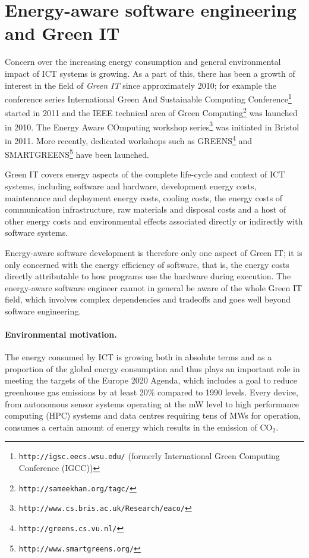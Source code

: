 \documentclass[oneside]{book}
\begin{document}
\section{Energy-aware software engineering and Green IT}
\label{greenit}
Concern over the increasing energy consumption and general environmental impact of ICT systems is growing.  As a part of this,
there has been a growth of interest in the field of \emph{Green IT}  \cite{KrauseCraigWood2010,DBLP:journals/stt/NaumannKD13,DBLP:journals/infsof/CapraFS12,Mahmoud_Ahmad_2013} since approximately 2010; for example the conference series International Green And Sustainable Computing Conference\footnote{\texttt{http://igsc.eecs.wsu.edu/} (formerly International Green Computing Conference (IGCC))} started in 2011 and the IEEE technical area of Green Computing\footnote{\texttt{http://sameekhan.org/tagc/}} was launched in 2010.  The Energy Aware COmputing workshop series\footnote{\texttt{http://www.cs.bris.ac.uk/Research/eaco/}} was initiated in Bristol in 2011.
More recently, dedicated workshops such as GREENS\footnote{\texttt{http://greens.cs.vu.nl/}} and SMARTGREENS\footnote{\texttt{http://www.smartgreens.org/}} have been launched. 

Green IT covers energy aspects of the complete life-cycle and context of ICT systems, including software and hardware, development energy costs, maintenance and deployment energy costs, cooling costs, the energy costs of communication infrastructure, raw materials and disposal costs and a host of other energy costs and environmental effects associated directly or indirectly with software systems. 



Energy-aware software development is therefore only one aspect of Green IT;  it is only concerned with the energy efficiency of software, that is, the energy costs directly attributable to how programs use the hardware during execution. The energy-aware software engineer cannot in general be aware of the whole Green IT field, which involves complex dependencies and tradeoffs and goes well beyond software engineering.



\paragraph{Environmental motivation.}
The energy consumed by ICT is growing both in absolute terms and as a proportion of the global energy consumption and thus plays an important role in meeting the targets of the Europe 2020 Agenda, which includes a goal to reduce greenhouse gas emissions by at least 20\% compared to 1990 levels.   Every device, from autonomous sensor systems operating at the mW level to high performance computing (HPC) systems and data centres requiring tens of MWs for operation, consumes a certain amount of energy which results in the emission of CO$_2$. 
\end{document}
